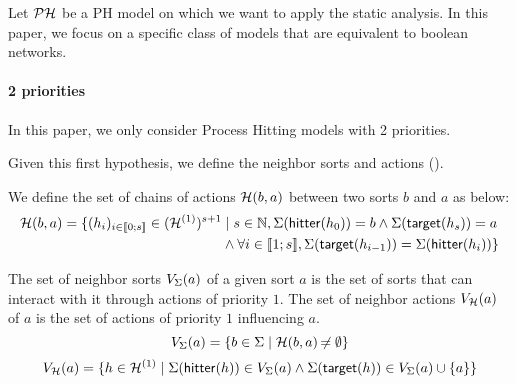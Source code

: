 
Let $\mathcal{PH}$ be a PH model on which we want to apply the static analysis.
In this paper, we focus on a specific class of models that are equivalent to boolean networks.

\paragraph{2 priorities}
In this paper, we only consider Process Hitting models with 2 priorities.

Given this first hypothesis, we define the neighbor  sorts and actions ().
\begin{definition}
\label{def:chainsactions}
  We define the set of chains of actions $\mathcal{H}(b, a)$ between two sorts $b$ and $a$ as below:
  \begin{align*}
  \mathcal{H}(b, a) = \{ (h_i)_{i \in \llbracket 0; s \rrbracket} \in (\mathcal{H}^{(1)})^{s+1} &\mid s \in \mathbb{N}, \Sigma(\mathsf{hitter}(h_0)) = b \wedge \Sigma(\mathsf{target}(h_s)) = a \\
    & \wedge \forall i \in \llbracket 1; s \rrbracket, \Sigma(\mathsf{target}(h_{i-1})) = \Sigma(\mathsf{hitter}(h_{i})) \}
  \end{align*}
\end{definition}
\begin{definition}
\label{def:neighbors}
  The set of neighbor sorts $V_\Sigma(a)$ of a given sort $a$ is the set of sorts that can interact with it through actions of priority $1$.
  The set of neighbor actions $V_{\mathcal{H}}(a)$ of $a$ is the set of actions of priority $1$ influencing $a$.
  $$V_\Sigma(a) = \{ b \in \Sigma \mid \mathcal{H}(b, a) \not\nobreak\mkern -2mu = \emptyset \}$$
  $$V_{\mathcal{H}}(a) = \{ h \in \mathcal{H}^{(1)} \mid \Sigma(\mathsf{hitter}(h)) \in V_\Sigma(a) \wedge \Sigma(\mathsf{target}(h)) \in V_\Sigma(a) \cup \{ a \} \}$$
\end{definition}


